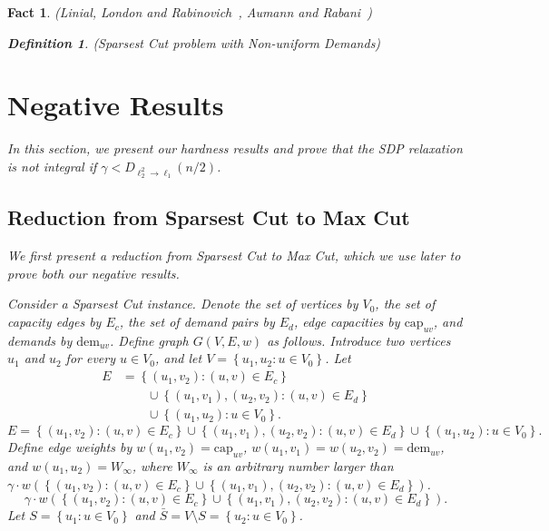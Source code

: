 \documentclass[twoside,leqno,twocolumn]{article}
\newcommand {\set}   [1] {\left\{ #1 \right\}}
\newtheorem{Definition}[theorem]{Definition}
\newtheorem{fact}[theorem]{Fact}
\begin{document}
\begin{fact}{\sc (Linial, London and Rabinovich~\cite{LLR}, Aumann and Rabani~\cite{AR})}
\begin{Definition} {\sc (Sparsest Cut problem with Non-uniform Demands)}
\section{Negative Results}\label{sec:negative}
In this section, we present our hardness results and prove that the SDP relaxation is not integral if $\gamma < D_{\ell_2^2\to \ell_1}(n/2)$.

\subsection{Reduction from Sparsest Cut to Max Cut} \label{sec:reduction}
We first present a reduction from Sparsest Cut to Max Cut, which we use later to prove both our negative results.

Consider a Sparsest Cut instance. Denote the set of vertices by $V_0$, the set of capacity edges by $E_c$, the set of demand pairs by $E_d$, 
edge capacities by $\mathrm{cap}_{uv}$, and demands by $\mathrm{dem}_{uv}$. Define graph $G(V, E, w)$ as follows. 
Introduce two vertices $u_1$ and $u_2$ for every $u\in V_0$, and let $V=\set{u_1,u_2:u\in V_0}$. Let 
\ifSODA
\begin{align*}
E &= \set{(u_1,v_2): (u,v) \in E_c} \\ &\qquad{} \cup  \set{(u_1,v_1), (u_2,v_2): (u,v) \in E_d} \\&\qquad{}\cup \set{(u_1,u_2): u\in V_0}.
\end{align*}
\else
$$E = \set{(u_1,v_2): (u,v) \in E_c} \cup \set{(u_1,v_1), (u_2,v_2): (u,v) \in E_d} \cup \set{(u_1,u_2): u\in V_0}.$$
\fi
Define edge weights by $w(u_1,v_2) = \mathrm{cap}_{uv}$, $w(u_1,v_1) = w(u_2, v_2) = \mathrm{dem}_{uv}$, and $w(u_1, u_2) = W_{\infty}$,
where $W_{\infty}$ is an arbitrary number larger than 
\ifSODA
$\gamma \cdot w(\set{(u_1,v_2): (u,v) \in E_c} \cup \set{(u_1,v_1), (u_2,v_2): (u,v) \in E_d})$.
\else
$$\gamma \cdot w(\set{(u_1,v_2): (u,v) \in E_c} \cup \set{(u_1,v_1), (u_2,v_2): (u,v) \in E_d}).$$
\fi
Let $S = \set{u_1:u\in V_0}$ and $\bar S = V\setminus S = \set{u_2: u\in V_0}$. 


\end{Definition}
\end{fact}
\end{document}
